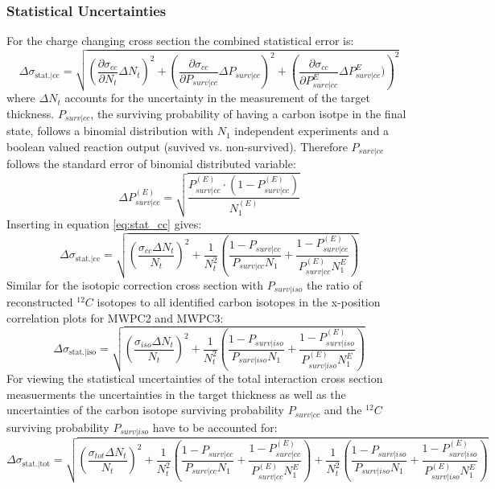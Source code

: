 \subsubsection{Statistical Uncertainties}
For the charge changing cross section the combined  statistical error is:\newline
\begin{equation}\label{eq:stat_cc}
\Delta\sigma_\text{stat.|cc} = \sqrt{\left(\frac{\partial \sigma_{cc}}{\partial N_t} \Delta N_t\right)^2 + \left(\frac{\partial \sigma_{cc}}{\partial P_{surv|cc}} \Delta P_{surv|cc}\right)^2 + \left(\frac{\partial \sigma_{cc}}{\partial P^{E}_{surv|cc}} \Delta P^{E}_{surv|cc})\right)^2}
\end {equation}
where $\Delta N_t$ accounts for the uncertainty in the measurement of the target thickness. $P_{surv|cc}$, the surviving probability of having a carbon isotpe in the final state, follows a binomial distribution with $N_1$ independent experiments and a boolean valued reaction output (suvived vs. non-survived). Therefore $P_{surv|cc}$ follows the standard error of binomial distributed variable:
\begin{equation}
\Delta P^{(E)}_{surv|cc} = \sqrt{\frac{P^{(E)}_{surv|cc}\cdot (1-P^{(E)}_{surv|cc})}{N^{(E)}_{1}}}
\end{equation}
Inserting in equation \ref{eq:stat_cc} gives:
\begin{equation}
\Delta\sigma_\text{stat.|cc} = \sqrt{\left(\frac{\sigma_{cc} \Delta N_t}{N_t}\right)^2 + \frac{1}{N_t^2} \left(\frac{1 - P_{surv|cc}}{P_{surv|cc} N_1} + \frac{1 - P^{(E)}_{surv|cc}}{P^{(E)}_{surv|cc} N_1^E}\right)}
\end{equation}
Similar for the isotopic correction cross section with $P_{surv|iso}$ the ratio of reconstructed $^{12}C$ isotopes to all identified carbon isotopes  in the x-position  correlation plots for MWPC2 and MWPC3: 
\begin{equation}
\Delta\sigma_\text{stat.|iso} = \sqrt{\left(\frac{\sigma_{iso} \Delta N_t}{N_t}\right)^2 + \frac{1}{N_t^2} \left(\frac{1 - P_{surv|iso}}{P_{surv|iso} N_1} + \frac{1 - P^{(E)}_{surv|iso}}{P^{(E)}_{surv|iso} N_1^E}\right)}
\end{equation}
For viewing the statistical uncertainties of the total interaction cross section measuerments the uncertainties in the target thickness as well as the uncertainties of the carbon isotope surviving probability $P_{surv|cc}$  and the $^{12}C$ surviving probability $P_{surv|iso}$ have to be accounted for:
\small
\begin{equation}
\Delta\sigma_\text{stat.|tot} = \sqrt{\left(\frac{\sigma_{tot} \Delta N_t}{N_t}\right)^2 + \frac{1}{N_t^2} \left(\frac{1 - P_{surv|cc}}{P_{surv|cc} N_1} + \frac{1 - P^{(E)}_{surv|cc}}{P^{(E)}_{surv|cc} N_1^E}\right)  + \frac{1}{N_t^2} \left(\frac{1 - P_{surv|iso}}{P_{surv|iso} N_1} + \frac{1 - P^{(E)}_{surv|iso}}{P^{(E)}_{surv|iso} N_1^E}\right)}
\end{equation}
\normalsize
